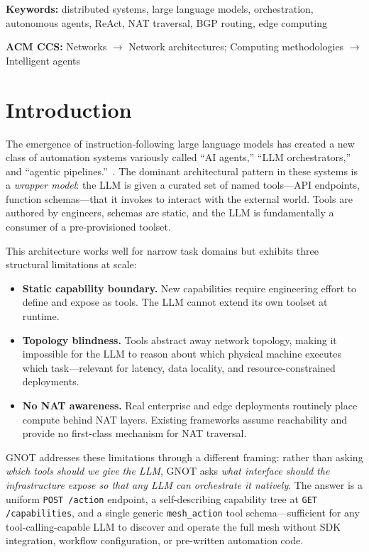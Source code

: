 \documentclass[10pt,twocolumn]{article}
\begin{document}
\noindent\textbf{Keywords:} distributed systems, large language models, orchestration,
autonomous agents, ReAct, NAT traversal, BGP routing, edge computing

\vspace{4pt}
\noindent\textbf{ACM CCS:} Networks $\to$ Network architectures;
Computing methodologies $\to$ Intelligent agents

\section{Introduction}

The emergence of instruction-following large language models has created
a new class of automation systems variously called ``AI agents,''
``LLM orchestrators,'' and ``agentic pipelines.''~\cite{langchain2023,
react2022}. The dominant architectural pattern in these systems is a
\emph{wrapper model}: the LLM is given a curated set of named
tools---API endpoints, function schemas---that it invokes to interact
with the external world. Tools are authored by engineers, schemas are
static, and the LLM is fundamentally a consumer of a pre-provisioned
toolset.

This architecture works well for narrow task domains but exhibits three
structural limitations at scale:

\begin{itemize}[noitemsep, leftmargin=12pt]
  \item \textbf{Static capability boundary.} New capabilities require
    engineering effort to define and expose as tools. The LLM cannot
    extend its own toolset at runtime.
  \item \textbf{Topology blindness.} Tools abstract away network
    topology, making it impossible for the LLM to reason about which
    physical machine executes which task---relevant for latency, data
    locality, and resource-constrained deployments.
  \item \textbf{No NAT awareness.} Real enterprise and edge deployments
    routinely place compute behind NAT layers. Existing frameworks
    assume reachability and provide no first-class mechanism for NAT
    traversal.
\end{itemize}

GNOT addresses these limitations through a different framing: rather
than asking \emph{which tools should we give the LLM}, GNOT asks
\emph{what interface should the infrastructure expose so that any LLM
can orchestrate it natively}. The answer is a uniform
\texttt{POST /action} endpoint, a self-describing capability tree at
\texttt{GET /capabilities}, and a single generic \texttt{mesh\_action}
tool schema---sufficient for any tool-calling-capable LLM to discover
and operate the full mesh without SDK integration, workflow
configuration, or pre-written automation code.
\end{document}
